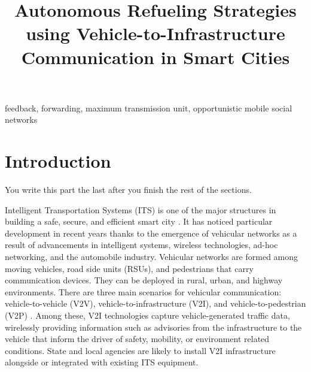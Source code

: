\documentclass[conference]{IEEEtran}
\theoremstyle{definition}
\begin{document}
\title{Autonomous Refueling Strategies using Vehicle-to-Infrastructure Communication in Smart Cities }

\author{
}
\maketitle

\begin{abstract}

\end{abstract}

\begin{IEEEkeywords} feedback, forwarding, maximum transmission unit, opportunistic mobile social networks  \end{IEEEkeywords}


\vspace{-0.3cm}
\section{Introduction}
{\color{red} You write this part the last after you finish the rest of the sections.}

Intelligent Transportation Systems (ITS) \cite{Alam2016} is one of the major structures in building a safe, secure, and efficient smart city \cite{Bowerman2000}. It has noticed particular development in recent years thanks to the emergence of vehicular networks as a result of advancements in intelligent systems, wireless technologies, ad-hoc networking, and the automobile industry. Vehicular networks are formed among moving vehicles, road side units (RSUs), and pedestrians that carry communication devices. They can be deployed in rural, urban, and highway environments.  There are three main scenarios for vehicular communication: vehicle-to-vehicle (V2V), vehicle-to-infrastructure (V2I), and vehicle-to-pedestrian (V2P) \cite{Tseng2015}. Among these, V2I technologies capture vehicle-generated traffic data, wirelessly providing information such as advisories from the infrastructure to the vehicle that inform the driver of safety, mobility, or environment related conditions. State and local agencies are likely to install V2I infrastructure alongside or integrated with existing ITS equipment.
\end{document}
